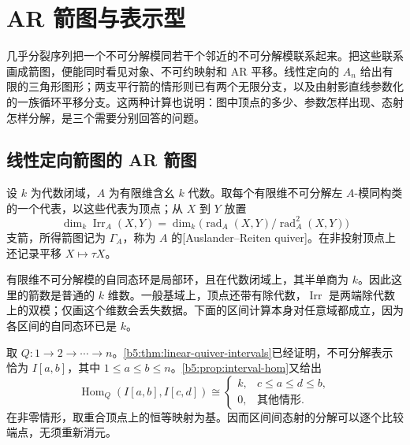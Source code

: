 
\section{AR 箭图与表示型}
\label{b5:sec:1007}

几乎分裂序列把一个不可分解模同若干个邻近的不可分解模联系起来。把这些联系画成箭图，便能同时看见对象、不可约映射和 AR 平移。线性定向的 \(A_n\) 给出有限的三角形图形；两支平行箭的情形则已有两个无限分支，以及由射影直线参数化的一族循环平移分支。这两种计算也说明：图中顶点的多少、参数怎样出现、态射怎样分解，是三个需要分别回答的问题。

\subsection{线性定向箭图的 AR 箭图}
\label{b5:subsec:1007:01}

\begin{definition}\label{b5:def:ar-quiver}
	设 \(k\) 为代数闭域，\(A\) 为有限维含幺 \(k\) 代数。取每个有限维不可分解左 \(A\)-模同构类的一个代表，以这些代表为顶点；从 \(X\) 到 \(Y\) 放置
	\[
		\dim_k\operatorname{Irr}_A(X,Y)
		=\dim_k\bigl(\operatorname{rad}_A(X,Y)/\operatorname{rad}_A^2(X,Y)\bigr)
	\]
	支箭，所得箭图记为 \(\Gamma_A\)，称为 \(A\) 的[Auslander--Reiten quiver]。在非投射顶点上还记录平移 \(X\mapsto\tau X\)。
\end{definition}

有限维不可分解模的自同态环是局部环，且在代数闭域上，其半单商为 \(k\)。因此这里的箭数是普通的 \(k\) 维数。一般基域上，顶点还带有除代数，\(\operatorname{Irr}\) 是两端除代数上的双模；仅画这个维数会丢失数据。下面的区间计算本身对任意域都成立，因为各区间的自同态环已是 \(k\)。

\ProseParagraphBreak
取 \(Q:1\to2\to\cdots\to n\)。\cref{b5:thm:linear-quiver-intervals}已经证明，不可分解表示恰为 \(I[a,b]\)，其中 \(1\le a\le b\le n\)。\cref{b5:prop:interval-hom}又给出
\[
	\operatorname{Hom}_Q(I[a,b],I[c,d])\cong
	\begin{cases}
		k,&c\le a\le d\le b,\\
		0,&\text{其他情形}.
	\end{cases}
\]
在非零情形，取重合顶点上的恒等映射为基。因而区间间态射的分解可以逐个比较端点，无须重新消元。

